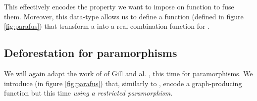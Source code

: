 This effectively encodes the property we want to impose on function to fuse them. Moreover, this data-type allows us to define a function  (defined in figure \ref{fig:parafus}) that transform a  into a real combination function for .

\subsection{Deforestation for paramorphisms}
\label{sec:defor-para}

We will again adapt the work of of Gill and al. \cite{Gill:1993:SCD:165180.165214}, this time for paramorphisms. We introduce  (in figure \ref{fig:parafus}) that, similarly to , encode a graph-producing function but this time \emph{using a restricted paramorphism}.


